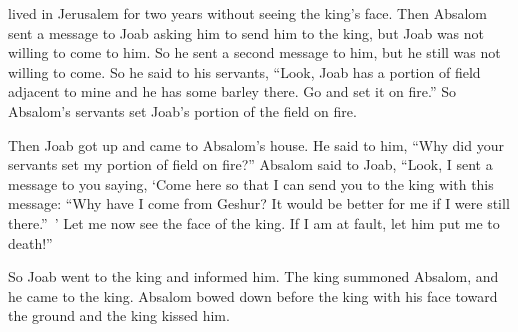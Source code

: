 {lived
in Jerusalem
for two years
without
seeing
the king’s
face.
Then Absalom
sent
a message to
Joab
asking him to
send
him to
the king,
but Joab was not
willing
to come
to
him. So he sent
a second
message to him, but he still
was not
willing
to come.
So he said
to
his servants,
“Look,
Joab
has a portion
of field adjacent
to mine and he has some
barley
there.
Go
and set
it on fire.”
So Absalom’s
servants
set
Joab’s portion
of the field on fire.
\par }{\PP {}Then Joab
got
up and came
to
Absalom’s
house.
He said
to him,
“Why
did your servants
set
my portion
of field on fire?”
Absalom
said
to
Joab,
“Look,
I sent
a message to
you saying,
‘Come
here
so that I can send
you to
the king
with this message: “Why have
I
come
from Geshur? It would be better
for me if I
were still
there.” ’
Let me now
see
the face
of the king.
If
I
am
at fault,
let him put me to death!”
\par }{\PP {}So Joab
went
to
the king
and informed
him. The king summoned
Absalom,
and he came
to
the king.
Absalom
bowed down
before
the king
with his face
toward the ground
and the king
kissed him.

}
